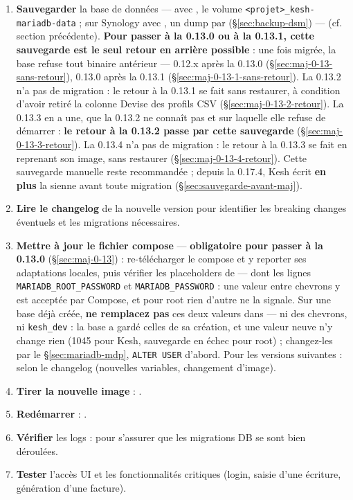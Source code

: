 \documentclass[a4paper,11pt,oneside]{article}
\begin{document}
\begin{enumerate}
    \item \textbf{Sauvegarder} la base de données --- avec , le volume \texttt{<projet>\_kesh-mariadb-data} ; sur Synology avec , un dump par  (\S\ref{sec:backup-dsm}) --- (cf. section précédente). \textbf{Pour passer à la 0.13.0 ou à la 0.13.1, cette sauvegarde est le seul retour en arrière possible} : une fois migrée, la base refuse tout binaire antérieur --- 0.12.x après la 0.13.0 (\S\ref{sec:maj-0-13-sans-retour}), 0.13.0 après la 0.13.1 (\S\ref{sec:maj-0-13-1-sans-retour}). La 0.13.2 n'a pas de migration : le retour à la 0.13.1 se fait sans restaurer, à condition d'avoir retiré la colonne Devise des profils CSV (\S\ref{sec:maj-0-13-2-retour}). La 0.13.3 en a une, que la 0.13.2 ne connaît pas et sur laquelle elle refuse de démarrer : \textbf{le retour à la 0.13.2 passe par cette sauvegarde} (\S\ref{sec:maj-0-13-3-retour}). La 0.13.4 n'a pas de migration : le retour à la 0.13.3 se fait en reprenant son image, sans restaurer (\S\ref{sec:maj-0-13-4-retour}). Cette sauvegarde manuelle reste recommandée ; depuis la 0.17.4, Kesh écrit \textbf{en plus} la sienne avant toute migration (\S\ref{sec:sauvegarde-avant-maj}).
    \item \textbf{Lire le changelog} de la nouvelle version pour identifier les breaking changes éventuels et les migrations nécessaires.
    \item \textbf{Mettre à jour le fichier compose} --- \textbf{obligatoire pour passer à la 0.13.0} (\S\ref{sec:maj-0-13}) : re-télécharger le compose et y reporter ses adaptations locales, puis vérifier les placeholders de  --- dont les lignes \texttt{MARIADB\_ROOT\_PASSWORD} et \texttt{MARIADB\_PASSWORD} : une valeur entre chevrons y est acceptée par Compose, et pour root rien d'autre ne la signale. Sur une base déjà créée, \textbf{ne remplacez pas} ces deux valeurs dans  --- ni des chevrons, ni \texttt{kesh\_dev} : la base a gardé celles de sa création, et une valeur neuve n'y change rien (1045 pour Kesh, sauvegarde en échec pour root) ; changez-les par le \S\ref{sec:mariadb-mdp}, \texttt{ALTER USER} d'abord. Pour les versions suivantes : selon le changelog (nouvelles variables, changement d'image).
    \item \textbf{Tirer la nouvelle image} : .
    \item \textbf{Redémarrer} : .
    \item \textbf{Vérifier} les logs :  pour s'assurer que les migrations DB se sont bien déroulées.
    \item \textbf{Tester} l'accès UI et les fonctionnalités critiques (login, saisie d'une écriture, génération d'une facture).
\end{enumerate}
\end{document}
